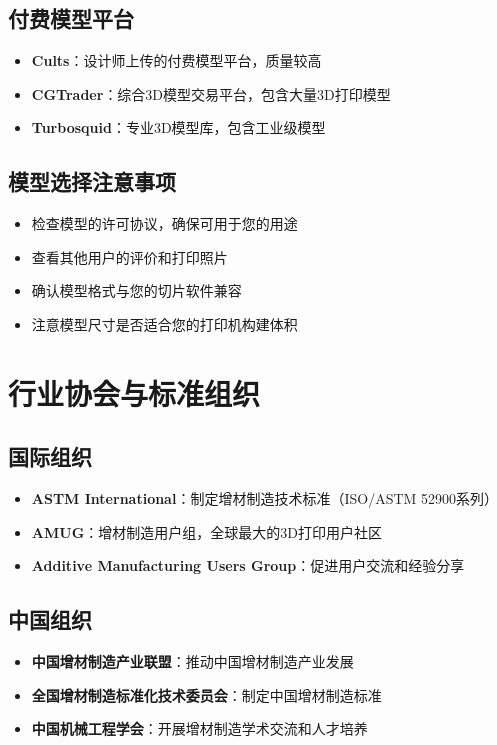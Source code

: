 \documentclass[12pt,UTF8]{ctexbook}
\begin{document}
\subsection{付费模型平台}
\begin{itemize}
\item \textbf{Cults}：设计师上传的付费模型平台，质量较高
\item \textbf{CGTrader}：综合3D模型交易平台，包含大量3D打印模型
\item \textbf{Turbosquid}：专业3D模型库，包含工业级模型
\end{itemize}

\subsection{模型选择注意事项}
\begin{itemize}
\item 检查模型的许可协议，确保可用于您的用途
\item 查看其他用户的评价和打印照片
\item 确认模型格式与您的切片软件兼容
\item 注意模型尺寸是否适合您的打印机构建体积
\end{itemize}

\section{行业协会与标准组织}

\subsection{国际组织}
\begin{itemize}
\item \textbf{ASTM International}：制定增材制造技术标准（ISO/ASTM 52900系列）
\item \textbf{AMUG}：增材制造用户组，全球最大的3D打印用户社区
\item \textbf{Additive Manufacturing Users Group}：促进用户交流和经验分享
\end{itemize}

\subsection{中国组织}
\begin{itemize}
\item \textbf{中国增材制造产业联盟}：推动中国增材制造产业发展
\item \textbf{全国增材制造标准化技术委员会}：制定中国增材制造标准
\item \textbf{中国机械工程学会}：开展增材制造学术交流和人才培养
\end{itemize}
\end{document}
